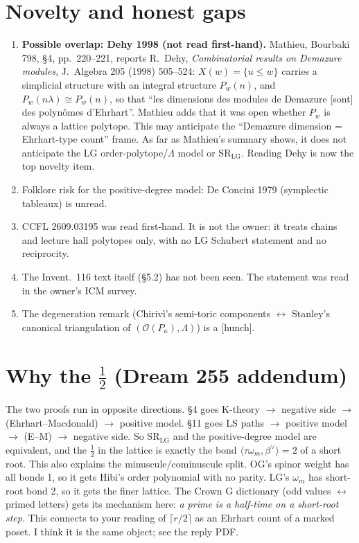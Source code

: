 \documentclass[10pt]{amsart}
\newcommand{\grade}[1]{\textsf{[#1]}}
\newcommand{\LG}{\mathrm{LG}}
\theoremstyle{remark}
\begin{document}
\section{Novelty and honest gaps}
\begin{enumerate}
\item \textbf{Possible overlap: Dehy 1998 (not read first-hand).} Mathieu, Bourbaki 798, \S4, pp.~220--221, reports R.~Dehy,
\emph{Combinatorial results on Demazure modules}, J.~Algebra 205 (1998) 505--524: $X(w)=\{u\le w\}$ carries a simplicial structure with
an integral structure $P_w(n)$, and $P_w(n\lambda)\cong P_w(n)$, so that ``les dimensions des modules de Demazure [sont] des
polyn\^omes d'Ehrhart''. Mathieu adds that it was open whether $P_w$ is always a lattice polytope. This may anticipate the
``Demazure dimension = Ehrhart-type count'' frame. As far as Mathieu's summary shows, it does not anticipate the LG
order-polytope/$\Lambda$ model or SR$_{\LG}$. Reading Dehy is now the top novelty item.
\item Folklore risk for the positive-degree model: De Concini 1979 (symplectic tableaux) is unread.
\item CCFL 2609.03195 was read first-hand. It is not the owner: it treats chains and lecture hall polytopes only, with no LG Schubert statement
and no reciprocity.
\item The Invent.\ 116 text itself (\S5.2) has not been seen. The statement was read in the owner's ICM survey.
\item The degeneration remark (Chirivì's semi-toric components $\leftrightarrow$ Stanley's canonical triangulation of
$(\mathcal O(P_\kappa),\Lambda)$) is a \grade{hunch}.
\end{enumerate}

\section{Why the $\tfrac12$ (Dream 255 addendum)}
The two proofs run in opposite directions. \S4 goes K-theory $\to$ negative side $\to$ (Ehrhart--Macdonald) $\to$ positive
model. \S11 goes LS paths $\to$ positive model $\to$ (E--M) $\to$ negative side. So SR$_{\LG}$ and the positive-degree model are
equivalent, and the $\tfrac12$ in the lattice is exactly the bond $\langle\tau\omega_m,\beta^\vee\rangle=2$ of a short root. This
also explains the minuscule/cominuscule split. OG's spinor weight has all bonds 1, so it gets Hibi's order polynomial with no
parity. LG's $\omega_m$ has short-root bond 2, so it gets the finer lattice. The Crown G dictionary (odd values $\leftrightarrow$ primed
letters) gets its mechanism here: \emph{a prime is a half-time on a short-root step}. This connects to your reading of
$\lceil r/2\rceil$ as an Ehrhart count of a marked poset. I think it is the same object; see the reply PDF.
\end{document}
